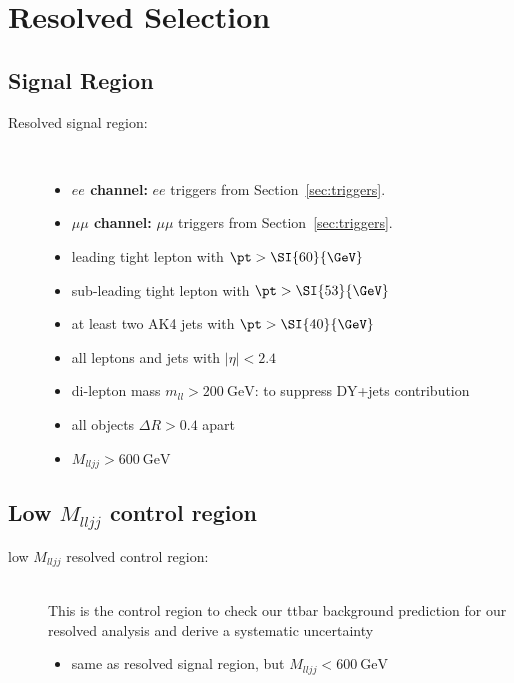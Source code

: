 \section{Resolved Selection}

\subsection{Signal Region}

\begin{description}
\item[Resolved signal region:] \
  \begin{itemize}
  \item \textbf{$ee$ channel:} $ee$ triggers from Section~\ref{sec:triggers}.
  \item \textbf{$\mu\mu$ channel:} $\mu\mu$ triggers from Section~\ref{sec:triggers}.
  \item leading tight lepton with $\pt > \SI{60}{\GeV}$
  \item sub-leading tight lepton with $\pt > \SI{53}{\GeV}$
  \item at least two AK4 jets with  $\pt > \SI{40}{\GeV}$
  \item all leptons and jets with $|\eta| < 2.4$
  \item di-lepton mass $m_{ll} > \SI{200} {\GeV}$: to suppress DY+jets contribution
  \item all objects $\Delta R > 0.4$ apart
  \item $M_{l l j j} > \SI{600}{\GeV}$
  \end{itemize}

\end{description}
\subsection{Low $M_{lljj}$ control region}

\begin{description}
\item[low $M_{lljj}$ resolved control region:]\ \\ This is the control region to check our ttbar background prediction for our resolved analysis and derive a systematic uncertainty
  \begin{itemize}
  \item same as resolved signal region, but $M_{l l j j} < \SI{600}{\GeV}$
  \end{itemize}
\end{description}

